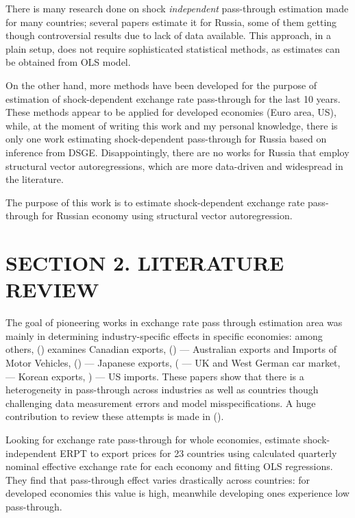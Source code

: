 \documentclass[12pt, a4paper]{extarticle}
\begin{document}
There is many research done on shock \textit{independent} pass-through estimation made for many countries; several papers estimate it for Russia, some of them getting though controversial results due to lack of data available. This approach, in a plain setup, does not require sophisticated statistical methods, as estimates can be obtained from OLS model.

On the other hand, more methods have been developed for the purpose of estimation of shock-dependent exchange rate pass-through for the last 10 years. These methods appear to be applied for developed economies (Euro area, US), while, at the moment of writing this work and my personal knowledge, there is only one work estimating shock-dependent pass-through for Russia based on inference from DSGE. Disappointingly, there are no works for Russia that employ structural vector autoregressions, which are more data-driven and widespread in the literature.

The purpose of this work is to estimate shock-dependent exchange rate pass-through for Russian economy using structural vector autoregression. 



\newpage
\section*{SECTION 2. LITERATURE REVIEW}
\setcounter{section}{2}
The goal of pioneering works in exchange rate pass through estimation area was mainly in determining industry-specific effects in specific economies: among others, (\cite{Schembri1985}) examines Canadian exports, (\cite{Menon1992, Menon1993}) --- Australian exports and Imports of Motor Vehicles, (\cite{Khosla1991, Athukorala1994}) --- Japanese exports, (\cite{Cowling1989} --- UK and West German car market, \cite{Athukorala1991} --- Korean exports, \cite{Baldwin1988, Feenstra1989, Hooper1989}) --- US imports. These papers show that there is a heterogeneity in pass-through across industries as well as countries though challenging data measurement errors and model misspecifications. A huge contribution to review these attempts is made in (\cite{Menon1993, Menon1995}).

Looking for exchange rate pass-through for whole economies, \autocite{Khosla1989} estimate shock-independent ERPT to export prices for 23 countries using calculated quarterly nominal effective exchange rate for each economy and fitting OLS regressions. They find that pass-through effect varies drastically across countries: for developed economies this value is high, meanwhile developing ones experience low pass-through.
\end{document}
